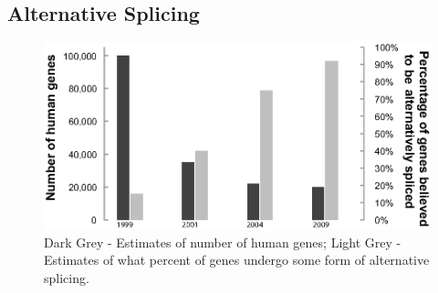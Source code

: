   \subsection{Alternative Splicing}\label{sec: AS}


    \citep{Kelemen2013}

    \citep{Barbosa-Morais2012,Merkin2012}  %

    \begin{figure}[htbp] %
      \centering 
      \includegraphics{Figures/Intro/numberHumanGenesAndNumberSpliced}
      \caption[Estimates of number of human genes, and percentage alternatively spliced over time]
      {
      Dark Grey - Estimates of number of human genes; Light Grey - Estimates of what percent of genes undergo some form of alternative splicing.
      }
      \label{fig:numGenesAndNumSpliced}
      \end{figure}

